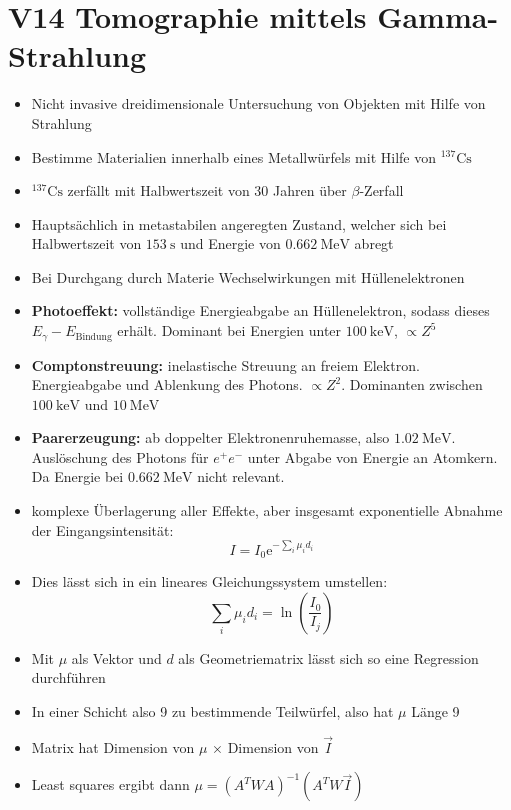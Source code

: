 \section{V14 Tomographie mittels Gamma-Strahlung}
\label{sec:V14}

\begin{itemize}
    \item Nicht invasive dreidimensionale Untersuchung von Objekten mit Hilfe von Strahlung
    \item Bestimme Materialien innerhalb eines Metallwürfels mit Hilfe von $^{137}\text{Cs}$
    \item $^{137}\text{Cs}$ zerfällt mit Halbwertszeit von 30 Jahren über $\beta$-Zerfall
    \item Hauptsächlich in metastabilen angeregten Zustand, welcher sich bei Halbwertszeit von $\SI{153}{\second}$ und Energie von $\SI{0,662}{\mega\electronvolt}$ abregt
    \item Bei Durchgang durch Materie Wechselwirkungen mit Hüllenelektronen
    \item \textbf{Photoeffekt:} vollständige Energieabgabe an Hüllenelektron, sodass dieses $E_\gamma - E_\text{Bindung}$ erhält. Dominant bei Energien unter $\SI{100}{\kilo\electronvolt}$, $\propto Z^5$
    \item \textbf{Comptonstreuung:} inelastische Streuung an freiem Elektron. Energieabgabe und Ablenkung des Photons. $\propto Z^2$. Dominanten zwischen $\SI{100}{\kilo\electronvolt}$ und $\SI{10}{\mega\electronvolt}$
    \item \textbf{Paarerzeugung:} ab doppelter Elektronenruhemasse, also $\SI{1,02}{\mega\electronvolt}$. Auslöschung des Photons für $e^+e^-$ unter Abgabe von Energie an Atomkern. Da Energie bei $\SI{0.662}{\mega\electronvolt}$ nicht relevant.
    \item komplexe Überlagerung aller Effekte, aber insgesamt exponentielle Abnahme der Eingangsintensität:
        \begin{equation}
            I = I_0\text{e}^{-\sum\limits_{i}\mu_id_i}
        \end{equation}
    \item Dies lässt sich in ein lineares Gleichungssystem umstellen:
        \begin{equation}
            \sum\limits_{i}\mu_id_i = \ln\left(\frac{I_0}{I_j}\right)
        \end{equation}
    \item Mit $\mu$ als Vektor und $d$ als Geometriematrix lässt sich so eine Regression durchführen
    \item In einer Schicht also 9 zu bestimmende Teilwürfel, also hat $\mu$ Länge 9
    \item Matrix hat Dimension von $\mu$ $\times$ Dimension von $\vec{I}$
    \item Least squares ergibt dann $\mu = (A^TWA)^{-1}(A^TW\vec{I})$
\end{itemize}

